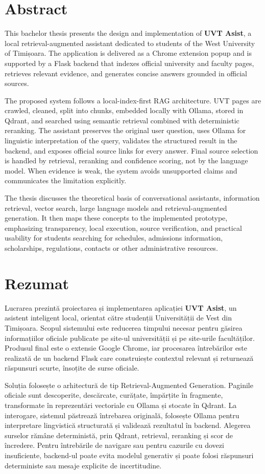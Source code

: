 \documentclass[12pt,a4paper]{report}
\theoremstyle{definition}
\theoremstyle{remark}
\begin{document}
\section*{Abstract}
This bachelor thesis presents the design and implementation of \textbf{UVT Asist}, a local retrieval-augmented assistant dedicated to students of the West University of Timișoara. The application is delivered as a Chrome extension popup and is supported by a Flask backend that indexes official university and faculty pages, retrieves relevant evidence, and generates concise answers grounded in official sources.

The proposed system follows a local-index-first RAG architecture. UVT pages are crawled, cleaned, split into chunks, embedded locally with Ollama, stored in Qdrant, and searched using semantic retrieval combined with deterministic reranking. The assistant preserves the original user question, uses Ollama for linguistic interpretation of the query, validates the structured result in the backend, and exposes official source links for every answer. Final source selection is handled by retrieval, reranking and confidence scoring, not by the language model. When evidence is weak, the system avoids unsupported claims and communicates the limitation explicitly.

The thesis discusses the theoretical basis of conversational assistants, information retrieval, vector search, large language models and retrieval-augmented generation. It then maps these concepts to the implemented prototype, emphasizing transparency, local execution, source verification, and practical usability for students searching for schedules, admissions information, scholarships, regulations, contacts or other administrative resources.

\newpage
\section*{Rezumat}
Lucrarea prezintă proiectarea și implementarea aplicației \textbf{UVT Asist}, un asistent inteligent local, orientat către studenții Universității de Vest din Timișoara. Scopul sistemului este reducerea timpului necesar pentru găsirea informațiilor oficiale publicate pe site-ul universității și pe site-urile facultăților. Produsul final este o extensie Google Chrome, iar procesarea întrebărilor este realizată de un backend Flask care construiește contextul relevant și returnează răspunsuri scurte, însoțite de surse oficiale.

Soluția folosește o arhitectură de tip Retrieval-Augmented Generation. Paginile oficiale sunt descoperite, descărcate, curățate, împărțite în fragmente, transformate în reprezentări vectoriale cu Ollama și stocate în Qdrant. La interogare, sistemul păstrează întrebarea originală, folosește Ollama pentru interpretare lingvistică structurată și validează rezultatul în backend. Alegerea surselor rămâne deterministă, prin Qdrant, retrieval, reranking și scor de încredere. Pentru întrebările de navigare sau pentru cazurile cu dovezi insuficiente, backend-ul poate evita modelul generativ și poate folosi răspunsuri deterministe sau mesaje explicite de incertitudine.
\end{document}
